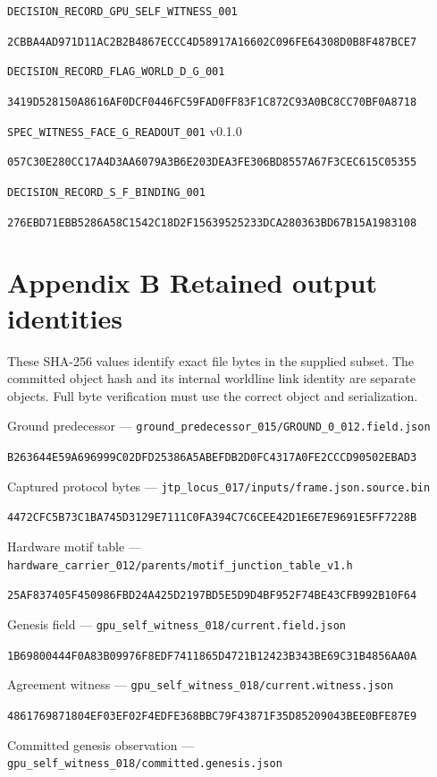 \documentclass[
]{article}
\begin{document}
\nolinkurl{DECISION_RECORD_GPU_SELF_WITNESS_001}

\nolinkurl{2CBBA4AD971D11AC2B2B4867ECCC4D58917A16602C096FE64308D0B8F487BCE7}

\nolinkurl{DECISION_RECORD_FLAG_WORLD_D_G_001}

\nolinkurl{3419D528150A8616AF0DCF0446FC59FAD0FF83F1C872C93A0BC8CC70BF0A8718}

\nolinkurl{SPEC_WITNESS_FACE_G_READOUT_001} v0.1.0

\nolinkurl{057C30E280CC17A4D3AA6079A3B6E203DEA3FE306BD8557A67F3CEC615C05355}

\nolinkurl{DECISION_RECORD_S_F_BINDING_001}

\nolinkurl{276EBD71EBB5286A58C1542C18D2F15639525233DCA280363BD67B15A1983108}

\section{Appendix B Retained output
identities}\label{appendix-b-retained-output-identities}

These SHA-256 values identify exact file bytes in the supplied subset.
The committed object hash and its internal worldline link identity are
separate objects. Full byte verification must use the correct object and
serialization.

Ground predecessor ---
\nolinkurl{ground_predecessor_015/GROUND_0_012.field.json}

\nolinkurl{B263644E59A696999C02DFD25386A5ABEFDB2D0FC4317A0FE2CCCD90502EBAD3}

Captured protocol bytes ---
\nolinkurl{jtp_locus_017/inputs/frame.json.source.bin}

\nolinkurl{4472CFC5B73C1BA745D3129E7111C0FA394C7C6CEE42D1E6E7E9691E5FF7228B}

Hardware motif table ---
\nolinkurl{hardware_carrier_012/parents/motif_junction_table_v1.h}

\nolinkurl{25AF837405F450986FBD24A425D2197BD5E5D9D4BF952F74BE43CFB992B10F64}

Genesis field --- \nolinkurl{gpu_self_witness_018/current.field.json}

\nolinkurl{1B69800444F0A83B09976F8EDF7411865D4721B12423B343BE69C31B4856AA0A}

Agreement witness ---
\nolinkurl{gpu_self_witness_018/current.witness.json}

\nolinkurl{4861769871804EF03EF02F4EDFE368BBC79F43871F35D85209043BEE0BFE87E9}

Committed genesis observation ---
\nolinkurl{gpu_self_witness_018/committed.genesis.json}
\end{document}
